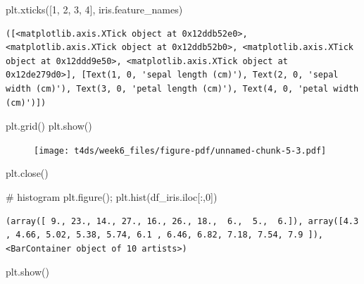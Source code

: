\documentclass[
  letterpaper,
  DIV=11,
  numbers=noendperiod]{scrreprt}
\newenvironment{Shaded}{\begin{snugshade}}{\end{snugshade}}
\newcommand{\CommentTok}[1]{\textcolor[rgb]{0.37,0.37,0.37}{#1}}
\newcommand{\DecValTok}[1]{\textcolor[rgb]{0.68,0.00,0.00}{#1}}
\newcommand{\NormalTok}[1]{\textcolor[rgb]{0.00,0.23,0.31}{#1}}
\newcommand{\OperatorTok}[1]{\textcolor[rgb]{0.37,0.37,0.37}{#1}}
\begin{document}
\begin{Shaded}
\begin{Highlighting}[]
\NormalTok{plt.xticks([}\DecValTok{1}\NormalTok{, }\DecValTok{2}\NormalTok{, }\DecValTok{3}\NormalTok{, }\DecValTok{4}\NormalTok{], iris.feature\_names)}
\end{Highlighting}
\end{Shaded}

\begin{verbatim}
([<matplotlib.axis.XTick object at 0x12ddb52e0>, <matplotlib.axis.XTick object at 0x12ddb52b0>, <matplotlib.axis.XTick object at 0x12ddd9e50>, <matplotlib.axis.XTick object at 0x12de279d0>], [Text(1, 0, 'sepal length (cm)'), Text(2, 0, 'sepal width (cm)'), Text(3, 0, 'petal length (cm)'), Text(4, 0, 'petal width (cm)')])
\end{verbatim}

\begin{Shaded}
\begin{Highlighting}[]
\NormalTok{plt.grid()}
\NormalTok{plt.show()}
\end{Highlighting}
\end{Shaded}

\begin{figure}[H]

{\centering \texttt{[image: t4ds/week6\_files/figure-pdf/unnamed-chunk-5-3.pdf]}

}

\end{figure}

\begin{Shaded}
\begin{Highlighting}[]
\NormalTok{plt.close()}

\CommentTok{\#  histogram}
\NormalTok{plt.figure()}\OperatorTok{;}
\NormalTok{plt.hist(df\_iris.iloc[:,}\DecValTok{0}\NormalTok{])}
\end{Highlighting}
\end{Shaded}

\begin{verbatim}
(array([ 9., 23., 14., 27., 16., 26., 18.,  6.,  5.,  6.]), array([4.3 , 4.66, 5.02, 5.38, 5.74, 6.1 , 6.46, 6.82, 7.18, 7.54, 7.9 ]), <BarContainer object of 10 artists>)
\end{verbatim}

\begin{Shaded}
\begin{Highlighting}[]
\NormalTok{plt.show()}
\end{Highlighting}
\end{Shaded}
\end{document}
